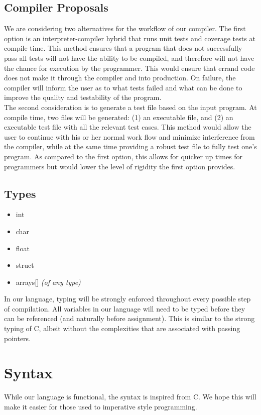 \documentclass{article}
\begin{document}
\subsection{Compiler Proposals}
We are considering two alternatives for the workflow of our compiler. The first option is an interpreter-compiler hybrid that runs unit tests and coverage tests at compile time. This method ensures that a program that does not successfully pass all tests will not have the ability to be compiled, and therefore will not have the chance for execution by the programmer. This would ensure that errand code does not make it through the compiler and into production. On failure, the compiler will inform the user as to what tests failed and what can be done to improve the quality and testability of the program. \\
The second consideration is to generate a test file based on the input program. At compile time, two files will be generated: (1) an executable file, and (2) an executable test file with all the relevant test cases. This method would allow the user to continue with his or her normal work flow and minimize interference from the compiler, while at the same time providing a robust test file to fully test one's program. As compared to the first option, this allows for quicker up times for programmers but would lower the level of rigidity the first option provides. 

\subsection{Types}
\begin{itemize}
	\item int
	\item char
	\item float
	\item struct
	\item arrays[] \textit{(of any type)}
\end{itemize}

In our language, typing will be strongly enforced throughout every possible step of compilation. All variables in our language will need to be typed before they can be referenced (and naturally before assignment). This is similar to the strong typing of C, albeit without the complexities that are associated with passing pointers. 
\section{Syntax}
While our language is functional, the syntax is inspired from C. We hope this will make it easier for those used to imperative style programming. 
\end{document}
